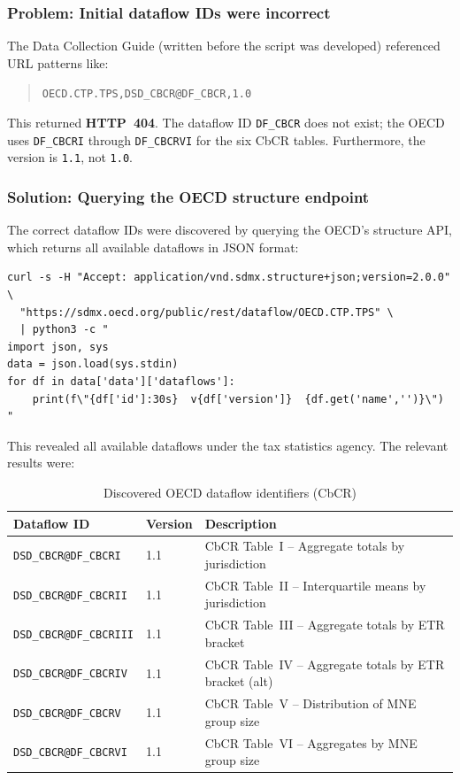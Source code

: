\documentclass[12pt,a4paper]{article}
\begin{document}
\subsubsection{Problem: Initial dataflow IDs were incorrect}

The Data Collection Guide (written before the script was developed) referenced URL patterns like:
\begin{quote}
\small\texttt{OECD.CTP.TPS,DSD\_CBCR@DF\_CBCR,1.0}
\end{quote}
This returned \textbf{HTTP~404}.
The dataflow ID \texttt{DF\_CBCR} does not exist; the OECD uses \texttt{DF\_CBCRI} through \texttt{DF\_CBCRVI} for the six CbCR tables.
Furthermore, the version is \texttt{1.1}, not \texttt{1.0}.

\subsubsection{Solution: Querying the OECD structure endpoint}

The correct dataflow IDs were discovered by querying the OECD's structure API, which returns all available dataflows in JSON format:

\begin{lstlisting}[style=shellstyle,caption={Discovering OECD dataflows}]
curl -s -H "Accept: application/vnd.sdmx.structure+json;version=2.0.0" \
  "https://sdmx.oecd.org/public/rest/dataflow/OECD.CTP.TPS" \
  | python3 -c "
import json, sys
data = json.load(sys.stdin)
for df in data['data']['dataflows']:
    print(f\"{df['id']:30s}  v{df['version']}  {df.get('name','')}\")
"
\end{lstlisting}

This revealed all available dataflows under the tax statistics agency.
The relevant results were:

\begin{table}[H]
\centering
\caption{Discovered OECD dataflow identifiers (CbCR)}
\label{tab:oecd_cbcr_flows}
\small
\begin{tabular}{llp{6cm}}
\toprule
\textbf{Dataflow ID} & \textbf{Version} & \textbf{Description} \\
\midrule
\texttt{DSD\_CBCR@DF\_CBCRI} & 1.1 & CbCR Table~I -- Aggregate totals by jurisdiction \\
\texttt{DSD\_CBCR@DF\_CBCRII} & 1.1 & CbCR Table~II -- Interquartile means by jurisdiction \\
\texttt{DSD\_CBCR@DF\_CBCRIII} & 1.1 & CbCR Table~III -- Aggregate totals by ETR bracket \\
\texttt{DSD\_CBCR@DF\_CBCRIV} & 1.1 & CbCR Table~IV -- Aggregate totals by ETR bracket (alt) \\
\texttt{DSD\_CBCR@DF\_CBCRV} & 1.1 & CbCR Table~V -- Distribution of MNE group size \\
\texttt{DSD\_CBCR@DF\_CBCRVI} & 1.1 & CbCR Table~VI -- Aggregates by MNE group size \\
\bottomrule
\end{tabular}
\end{table}
\end{document}

